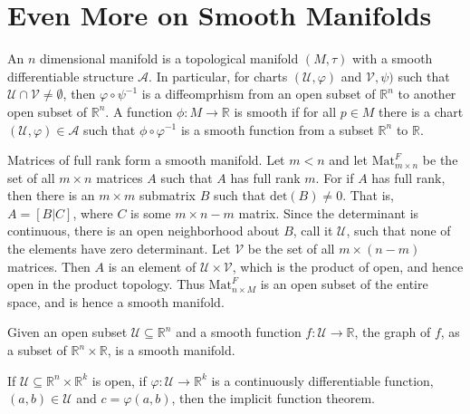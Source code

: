 \documentclass{article}                                                        %
\begin{document}
    \section{Even More on Smooth Manifolds}
        An $n$ dimensional manifold is a topological manifold $(M,\tau)$ with a
        smooth differentiable structure $\mathcal{A}$. In particular, for charts
        $(\mathcal{U},\varphi)$ and $\mathcal{V},\psi)$ such that
        $\mathcal{U}\cap\mathcal{V}\ne\emptyset$, then
        $\varphi\circ\psi^{\minus{1}}$ is a diffeomprhism from an open subset of
        $\mathbb{R}^{n}$ to another open subset of $\mathbb{R}^{n}$. A function
        $\phi:M\rightarrow\mathbb{R}$ is smooth if for all $p\in{M}$ there is a
        chart $(\mathcal{U},\varphi)\in\mathcal{A}$ such that
        $\phi\circ\varphi^{\minus{1}}$ is a smooth function from a subset
        $\mathbb{R}^{n}$ to $\mathbb{R}$.
        \begin{example}
            Matrices of full rank form a smooth manifold. Let $m<n$ and let
            $\textrm{Mat}_{m\times{n}}^{F}$ be the set of all $m\times{n}$
            matrices $A$ such that $A$ has full rank $m$. For if $A$ has full
            rank, then there is an $m\times{m}$ submatrix $B$ such that
            $\textrm{det}(B)\ne{0}$. That is, $A=[B|C]$, where $C$ is some
            $m\times{n-m}$ matrix. Since the determinant is continuous, there
            is an open neighborhood about $B$, call it $\mathcal{U}$, such that
            none of the elements have zero determinant. Let $\mathcal{V}$ be
            the set of all $m\times(n-m)$ matrices. Then $A$ is an element of
            $\mathcal{U}\times\mathcal{V}$, which is the product of open, and
            hence open in the product topology. Thus
            $\textrm{Mat}_{n\times{M}}^{F}$ is an open subset of the entire
            space, and is hence a smooth manifold.
        \end{example}
        \begin{example}
            Given an open subset $\mathcal{U}\subseteq\mathbb{R}^{n}$ and a
            smooth function $f:\mathcal{U}\rightarrow\mathbb{R}$, the graph of
            $f$, as a subset of $\mathbb{R}^{n}\times\mathbb{R}$, is a smooth
            manifold.
        \end{example}
        \begin{theorem}
            If $\mathcal{U}\subseteq\mathbb{R}^{n}\times\mathbb{R}^{k}$ is open,
            if $\varphi:\mathcal{U}\rightarrow\mathbb{R}^{k}$ is a continuously
            differentiable function, $(a,b)\in\mathcal{U}$ and
            $c=\varphi(a,b)$, then the implicit function theorem.
        \end{theorem}
\end{document}
